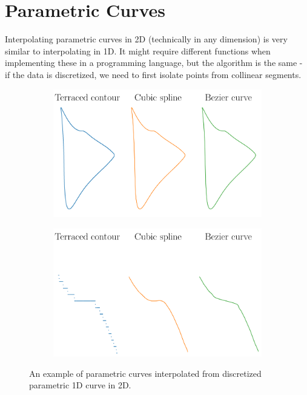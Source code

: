 \documentclass[a4paper,10pt]{report}
\begin{document}
\section{Parametric Curves}\label{sec:param_curve}
Interpolating parametric curves in 2D (technically in any dimension) is very similar to interpolating in 1D. It might require different functions when implementing these in a programming language, but the algorithm is the same - if the data is discretized, we need to first isolate points from collinear segments.
\begin{figure}[H]
    \centering
    \begin{subfigure}{0.49\textwidth}
        \includegraphics[width=\textwidth]{../images/2D_Contour.png}
    \end{subfigure}
    \hfill
    \begin{subfigure}{0.49\textwidth}
        \includegraphics[width=\textwidth]{../images/2D_Contour_Zoomed.png}
    \end{subfigure}
    \caption{An example of parametric curves interpolated from discretized parametric 1D curve in 2D.}
    \label{fig:2D_parametric_curve}
\end{figure}
\end{document}
